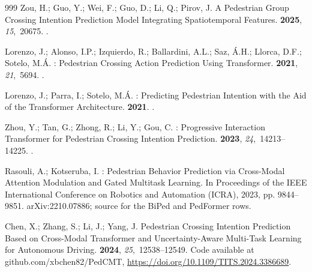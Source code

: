 \documentclass[mti,article,submit,moreauthors]{Definitions/mdpi}
\begin{document}
\begin{thebibliography}{999}
Zou, H.; Guo, Y.; Wei, F.; Guo, D.; Li, Q.; Pirov, J.
\newblock A Pedestrian Group Crossing Intention Prediction Model Integrating
  Spatiotemporal Features.
 {\bf 2025}, {\em 15},~20675.
.

Lorenzo, J.; Alonso, I.P.; Izquierdo, R.; Ballardini, A.L.; Saz, {\'A}.H.;
  Llorca, D.F.; Sotelo, M.{\'A}.
: Pedestrian Crossing Action Prediction Using Transformer.
 {\bf 2021}, {\em 21},~5694.
.

Lorenzo, J.; Parra, I.; Sotelo, M.{\'A}.
: Predicting Pedestrian Intention with the Aid of the
  Transformer Architecture.
 {\bf 2021}.
.

Zhou, Y.; Tan, G.; Zhong, R.; Li, Y.; Gou, C.
: Progressive Interaction Transformer for Pedestrian Crossing
  Intention Prediction.
 {\bf
  2023}, {\em 24},~14213--14225.
.

Rasouli, A.; Kotseruba, I.
: Pedestrian Behavior Prediction via Cross-Modal Attention
  Modulation and Gated Multitask Learning.
\newblock In Proceedings of the IEEE International Conference on Robotics and
  Automation (ICRA),  2023, pp. 9844--9851.
\newblock arXiv:2210.07886; source for the BiPed and PedFormer rows.

Chen, X.; Zhang, S.; Li, J.; Yang, J.
\newblock Pedestrian Crossing Intention Prediction Based on Cross-Modal
  Transformer and Uncertainty-Aware Multi-Task Learning for Autonomous Driving.
 {\bf
  2024}, {\em 25},~12538--12549.
\newblock Code available at github.com/xbchen82/PedCMT,
  {\url{https://doi.org/10.1109/TITS.2024.3386689}}.


\end{thebibliography}
\end{document}
